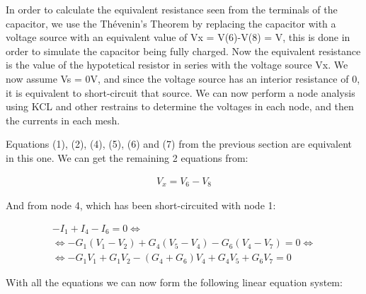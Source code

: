 \hspace{12pt} In order to calculate the equivalent resistance seen from the terminals of the capacitor, we use the Thévenin's Theorem by replacing the capacitor with a voltage source with an equivalent value of Vx = V(6)-V(8) =  V, this is done in order to simulate the capacitor being fully charged. Now the equivalent resistance is the value of the hypotetical resistor in series with the voltage source Vx. We now assume Vs = 0V, and since the voltage source has an interior resistance of 0, it is equivalent to short-circuit that source. We can now perform a node analysis using KCL and other restrains to determine the voltages in each node, and then the currents in each mesh.

Equations (1), (2), (4), (5), (6) and (7) from the previous section are equivalent in this one. We can get the remaining 2 equations from:

\begin{gather}
	V_x=V_6-V_8
\end{gather}

And from node 4, which has been short-circuited with node 1:

\begin{gather}
	-I_1+I_4-I_6=0 \iff \nonumber \\
	\iff -G_1(V_1-V_2)+G_4(V_5-V_4)-G_6(V_4-V_7)=0 \iff \\
	\iff -G_1V_1+G_1V_2-(G_4+G_6)V_4+G_4V_5+G_6V_7=0 \nonumber
\end{gather}

With all the equations we can now form the following linear equation system:

